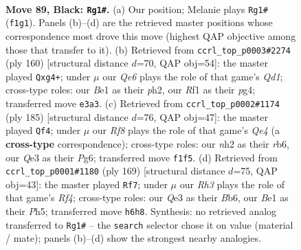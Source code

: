 \documentclass[11pt]{article}
\begin{document}
\clearpage

\begin{figure}[p]\centering
\begin{subfigure}{0.46\textwidth}\centering
\resizebox{\linewidth}{!}{%
\newchessgame
\chessboard[
  setfen={4k3/p5Q1/7r/7P/3P4/4q3/6KN/4br2 b - - 1 89},
  showmover=false,
  pgfstyle=straightmove, color=movearrow, markmove={f1-g1}
]}
\caption{}
\end{subfigure}\hfill
\begin{subfigure}{0.46\textwidth}\centering
\resizebox{\linewidth}{!}{%
\newchessgame
\chessboard[
  setfen={2q5/3R1pk1/8/4p3/p5p1/8/P6p/K2Q4 w - - 0 81},
  showmover=false,
  pgfstyle=straightmove, color=movearrow, markmove={d1-g4}
]}
\caption{}
\end{subfigure}
\\[4pt]
\begin{subfigure}{0.46\textwidth}\centering
\resizebox{\linewidth}{!}{%
\newchessgame
\chessboard[
  setfen={1rQ5/1P6/1RK3pk/4qp2/3P4/8/8/8 b - - 0 93},
  showmover=false,
  pgfstyle=straightmove, color=movearrow, markmove={e5-f4}
]}
\caption{}
\end{subfigure}\hfill
\begin{subfigure}{0.46\textwidth}\centering
\resizebox{\linewidth}{!}{%
\newchessgame
\chessboard[
  setfen={8/4k2Q/1b1r4/5r1p/P4P2/5BK1/8/8 b - - 7 85},
  showmover=false,
  pgfstyle=straightmove, color=movearrow, markmove={f5-f7}
]}
\caption{}
\end{subfigure}
\caption{\textbf{Move 89, Black: \texttt{Rg1\#}.} (a) Our position; Melanie plays \texttt{Rg1\#} (\texttt{f1g1}). Panels (b)--(d) are the retrieved master positions whose correspondence most drove this move (highest QAP objective among those that transfer to it). (b) Retrieved from \texttt{ccrl\_top\_p0003\#2274} (ply 160) [structural distance $d$=70, QAP obj=54]: the master played \texttt{Qxg4+}; under $\mu$ our \emph{Qe6} plays the role of that game's \emph{Qd1}; cross-type roles: our \emph{B}e1 as their \emph{p}h2, our \emph{R}f1 as their \emph{p}g4; transferred move \texttt{e3a3}. (c) Retrieved from \texttt{ccrl\_top\_p0002\#1174} (ply 185) [structural distance $d$=76, QAP obj=47]: the master played \texttt{Qf4}; under $\mu$ our \emph{Rf8} plays the role of that game's \emph{Qe4} (a \textbf{cross-type} correspondence); cross-type roles: our \emph{n}h2 as their \emph{r}b6, our \emph{Q}e3 as their \emph{P}g6; transferred move \texttt{f1f5}. (d) Retrieved from \texttt{ccrl\_top\_p0001\#1180} (ply 169) [structural distance $d$=75, QAP obj=43]: the master played \texttt{Rf7}; under $\mu$ our \emph{Rh3} plays the role of that game's \emph{Rf4}; cross-type roles: our \emph{Q}e3 as their \emph{B}b6, our \emph{B}e1 as their \emph{P}h5; transferred move \texttt{h6h8}. Synthesis: no retrieved analog transferred to \texttt{Rg1\#} -- the \texttt{search} selector chose it on value (material / mate); panels (b)--(d) show the strongest nearby analogies.}
\label{fig:thought-m177}
\end{figure}
\end{document}
